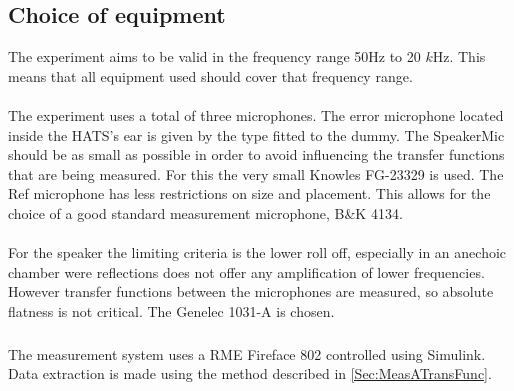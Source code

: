 \subsection{Choice of equipment}
The experiment aims to be valid in the frequency range 50Hz to 20 $k$Hz. This means that all equipment used should cover that frequency range. \\\\
The experiment uses a total of three microphones. The error microphone located inside the HATS's ear is given by the type fitted to the dummy. The SpeakerMic should be as small as possible in order to avoid influencing the transfer functions that are being measured. For this the very small Knowles FG-23329 is used. The Ref microphone has less restrictions on size and placement. This allows for the choice of a good standard measurement microphone, B\&K 4134. \\\\
For the speaker the limiting criteria is the lower roll off, especially in an anechoic chamber were reflections does not offer any amplification of lower frequencies. However transfer functions between the microphones are measured, so absolute flatness is not critical. The Genelec 1031-A is chosen. \\\\
The measurement system uses a RME Fireface 802 controlled using Simulink\textsuperscript{\textregistered}. Data extraction is made using the method described in \autoref{Sec:MeasATransFunc}.


